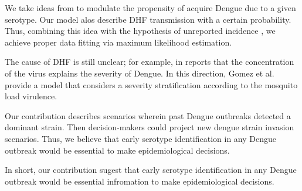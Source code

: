      We take ideas from \cite{Zheng2018, Nuraini2007, Feng1997a} to modulate 
the propensity of acquire Dengue due to a given serotype.  
Our model alos describe DHF transmission with a certain probability.  
Thus, combining this idea with the hypothesis of unreported 
incidence \cite{Li2013b,Guzman2002}, we achieve proper
data fitting via maximum likelihood estimation. 

    The cause of DHF is still unclear; for example, in \cite{ESTEVA2015} reports
that the concentration of the virus explains the severity of Dengue.
In this direction, Gomez et al. provide a model that considers a
severity stratification according to the mosquito load virulence.

    Our contribution describes scenarios wherein past Dengue
outbreaks detected a dominant  strain. Then decision-makers could
project new dengue strain invasion scenarios. Thus, we believe that early 
serotype identification in any Dengue outbreak would be essential to  
make epidemiological decisions.

    In short, our contribution sugest that early serotype identification in any Dengue
outbreak would be essential infromation to make epidemiological decisions.

